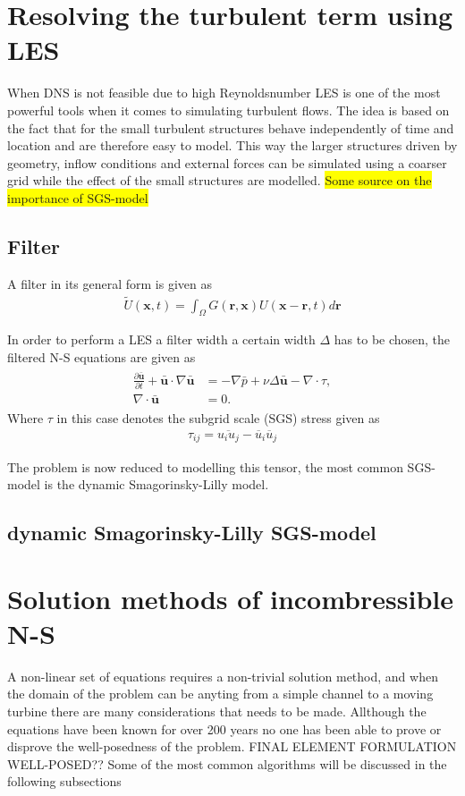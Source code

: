 \section{Resolving the turbulent term using LES}
When DNS is not feasible due to high Reynoldsnumber LES is one of the most powerful tools when it comes to simulating turbulent flows.
The idea is based on the fact that for the small turbulent structures behave independently of time and location and are therefore 
easy to model. This way the larger structures driven by geometry, inflow conditions and external forces can be simulated using a coarser 
grid while the effect of the small structures are modelled. \colorbox{yellow}{Some source on the importance of SGS-model}

\subsection{Filter}
A filter in its general form is given as 
\begin{align}
    \tilde{U}(\mathbf{x},t) = \int_{\Omega} G(\mathbf{r},\mathbf{x})U(\mathbf{x}-\mathbf{r},t)d\mathbf{r}
    \label{eq:filter}
\end{align}

In order to perform a LES a filter width a certain width $\Delta$ has to be chosen, 
the filtered N-S equations are given as 
%
\begin{align}
    \begin{split}
        \frac{\partial \mathbf{\bar{u}}}{\partial t} + \mathbf{\bar{u}}\cdot \nabla\mathbf{\bar{u}}
        &= -\nabla \bar{p} +\nu\Delta \mathbf{\bar{u}}-\nabla \cdot \tau, \\
        \nabla \cdot \mathbf{\bar{u}} &= 0.
    \end{split}
	\label{eq:NSfiltered}
\end{align}
%
Where $\tau$ in this case denotes the subgrid scale (SGS) stress given as 
\begin{align}
    \tau_{ij} = \overline{u_iu_j}-\overline{u}_i \overline{u}_j
    \label{eq:sgstensor}
\end{align}

The problem is now reduced to modelling this tensor, the most common SGS-model is the 
dynamic Smagorinsky-Lilly model.
\subsection{dynamic Smagorinsky-Lilly SGS-model}

\section{Solution methods of incombressible N-S}
A non-linear set of equations requires a non-trivial solution method, and when the domain of the problem can be anyting from a simple channel 
to a moving turbine there are many considerations that needs to be made. Allthough the equations have been known for over 200 years no one 
has been able to prove or disprove the well-posedness of the problem. FINAL ELEMENT FORMULATION WELL-POSED?? Some of the most common algorithms 
will be discussed in the following subsections

